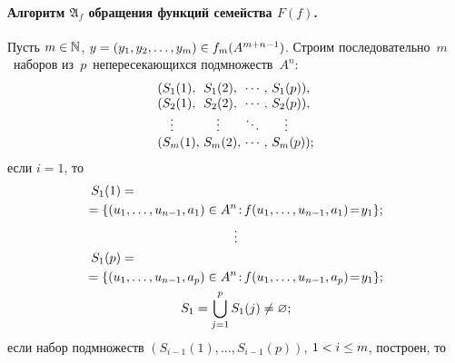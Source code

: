 \begin{multicols}{2}
\paragraph*{Алгоритм $\mathfrak{A}_f$ обращения функций семейства $F(f)$.}
Пусть $m\hm\in\mathbb{N}$, $y\hm=(y_1,y_2,\ldots,y_m)\in f_m(A^{m+n-1})$.
Строим последовательно~$m$~наборов из~$p$~непересекающихся подмножеств~$A^n$:
$$
\begin{array}{l@{\ }l@{\ }l@{\ }l}
  (S_1(1), &S_1(2), &\cdots, &S_1(p)),\\
  (S_2(1), &S_2(2), &\cdots, &S_2(p)),\\
   \quad\vdots  &\quad \vdots  &\ddots\,  &\quad\vdots \\
  (S_m(1), &S_m(2), &\cdots, &S_m(p));
\end{array}$$
если $i=1$, то
\begin{gather*}
\hspace*{-67mm}S_1(1)={}\\
\hspace*{-2.94907pt}{}=\{(u_1,\ldots,u_{n-1},a_1)\in A^n\colon \!f(u_1,\ldots,u_{n-
1},a_1)\!=\!y_1\};\\
\vdots\\
\hspace*{-67mm}S_1(p)={}\\
\hspace*{-2.94907pt}{}=\{(u_1,\ldots,u_{n-1},a_p)\in A^n\colon\! f(u_1,\ldots,u_{n-
1},a_p)\!=\!y_1\};\\
S_1=\bigcup\limits_{j=1}^p S_1(j)\neq\varnothing;
\end{gather*}
если набор подмножеств $(S_{i-1}(1),\ldots,S_{i-1}(p))$, $1\hm< i\hm\leq m$, построен, 
то


\end{multicols}
